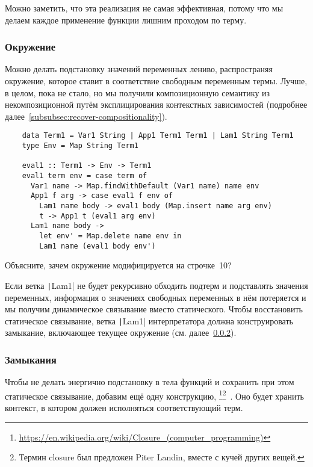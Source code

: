 Можно заметить, что эта реализация не самая эффективная, потому что мы делаем каждое применение функции лишним проходом по терму.

\subsubsection{Окружение}

Можно делать подстановку значений переменных лениво, распространяя окружение, которое ставит в соответствие свободным переменным термы.
Лучше, в целом, пока не стало, но мы получили композиционную семантику из некомпозиционной путём эксплицирования контекстных зависимостей (подробнее далее~\ref{subsubsec:recover-compositionality}).

\begin{verbatim}
    data Term1 = Var1 String | App1 Term1 Term1 | Lam1 String Term1
    type Env = Map String Term1

    eval1 :: Term1 -> Env -> Term1
    eval1 term env = case term of
      Var1 name -> Map.findWithDefault (Var1 name) name env
      App1 f arg -> case eval1 f env of
        Lam1 name body -> eval1 body (Map.insert name arg env)
        t -> App1 t (eval1 arg env)
      Lam1 name body ->
        let env' = Map.delete name env in
        Lam1 name (eval1 body env')
\end{verbatim}

\begin{task}
    Объясните, зачем окружение модифицируется на строчке~10?
\end{task}

Если ветка \texttt|Lam1| не будет рекурсивно обходить подтерм и подставлять значения переменных, информация о значениях свободных переменных в нём потеряется и мы получим динамическое связывание вместо статического.
Чтобы восстановить статическое связывание, ветка \texttt|Lam1| интерпретатора должна конструировать замыкание, включающее текущее окружение (см. далее~\ref{subsubsec:closures}).

\subsubsection{Замыкания} \label{subsubsec:closures}

Чтобы не делать энергично подстановку в тела функций и сохранить при этом статическое связывание, добавим ещё одну конструкцию, \footnote{\url{https://en.wikipedia.org/wiki/Closure_(computer_programming)}}\footnote{Термин closure был предложен Piter Landin, вместе с кучей других вещей.}~\cite[глава 11]{nystrom2021crafting}.
Оно будет хранить контекст, в котором должен исполняться соответствующий терм.

